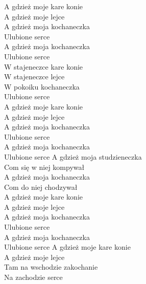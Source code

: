 
 A gdzież moje kare konie\\
 A gdzież moje lejce\\
 A gdzież moja kochaneczka\\
 Ulubione serce\\
 A gdzież moja kochaneczka\\
 Ulubione serce\\
\hop
W stajeneczce kare konie\\
W stajeneczce lejce\\
W pokoiku kochaneczka\\
Ulubione serce\\
\hop
{} A gdzież moje kare konie \tab{}\\
 A gdzież moje lejce \tab{}\\
 A gdzież moja kochaneczka \\
 Ulubione serce \tab{}\\
 A gdzież moja kochaneczka \\
 Ulubione serce \tab{}
\hop
A gdzież moja studzieneczka\\
Com się w niej kompywał\\
A gdzież moja kochaneczka\\
Com do niej chodzywał\\
\hop
{} A gdzież moje kare konie \tab{}\\
 A gdzież moje lejce \tab{}\\
 A gdzież moja kochaneczka \\
 Ulubione serce \tab{}\\
 A gdzież moja kochaneczka \\
 Ulubione serce \tab{}
\hop
A gdzież moje kare konie\\
A gdzież moje lejce\\
Tam na wschodzie zakochanie\\
Na zachodzie serce